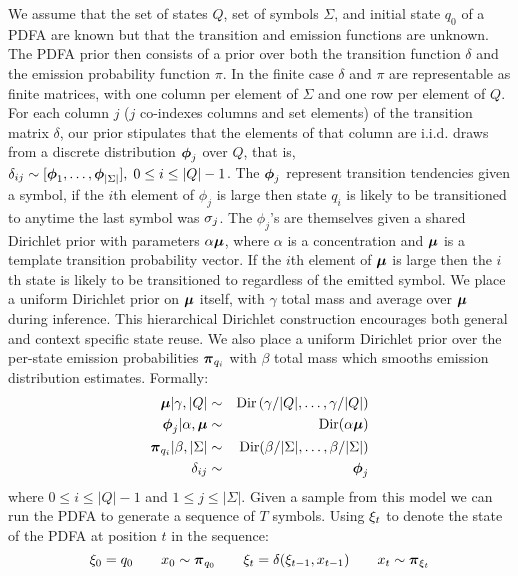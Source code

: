 We assume that the set of states $Q$, set of symbols $\Sigma$, and initial state $q_0$ of a PDFA are known but that the transition and emission functions are unknown.  The PDFA prior then consists of a prior over both the transition function $\delta$ and the emission probability function $\pi$.  In the finite case $\delta$ and $\pi$ are representable as finite matrices, with one column per element of $\Sigma$ and one row per element of $Q$.  For each column $j$ ($j$ co-indexes columns and set elements) of the transition matrix $\delta$, our prior stipulates that the elements of that column are  i.i.d. draws from a discrete distribution $\bphi_j$ over $Q$, that is, $\delta_{ij} \sim [\bphi_1,\ldots,\bphi_{|\Sigma|}], \; 0 \leq i\leq|Q|-1$.  The $\bphi_j$ represent transition tendencies given a symbol, if the $i$th element of $\phi_{j}$ is large then state $q_i$ is likely to be transitioned to anytime the last symbol was $\symb_j$.   The $\phi_{j}$'s are   themselves given a shared Dirichlet prior with parameters $\alpha\bmu$, where $\alpha$ is a concentration and $\bmu$ is a template transition probability vector.   If the $i$th element of $\bmu$ is large then the $i$th state is likely to be transitioned to regardless of the emitted symbol.  We place a uniform Dirichlet prior on $\bmu$ itself, with $\gamma$ total mass and average over $\bmu$ during inference.  This hierarchical Dirichlet construction encourages both general and context specific state reuse.
 We also place a uniform Dirichlet prior over the per-state emission probabilities $\bpi_{q_i}$ with $\beta$ total mass which smooths emission distribution estimates.  Formally:
%
\begin{eqnarray}
\bmu|\gamma,|Q| & \sim & \mathrm{Dir}\left(\gamma/|Q|,\ldots,\gamma/|Q|\right) \label{gen:mu}  \\
\bphi_{j}|\alpha,\bmu  & \sim & \mathrm{Dir}(\alpha\bmu) \label{gen:phi} \\
\bpi_{q_i}|\beta,|\Sigma| & \sim & \mathrm{Dir}(\beta/|\Sigma|,\ldots,\beta/|\Sigma|) \label{gen:pi} \nonumber \\
\delta_{ij} & \sim & \bphi_{j} \label{gen:delta} \nonumber
\end{eqnarray}
%
where $0 \leq i \leq |Q|-1$ and $1 \leq j \leq |\Sigma|$.  Given a sample from this model we can run the PDFA to generate a sequence of $T$ symbols.  Using $\q_t$ to denote the state of the PDFA at position $t$ in the sequence:
%
\begin{equation}
\q_0 = \state_0 \qquad
x_0 \sim \bpi_{q_0} \qquad
\q_t = \delta(\q_{t-1},x_{t-1}) \qquad
x_t \sim \bpi_{\q_t} \label{gen} \nonumber
\end{equation}
